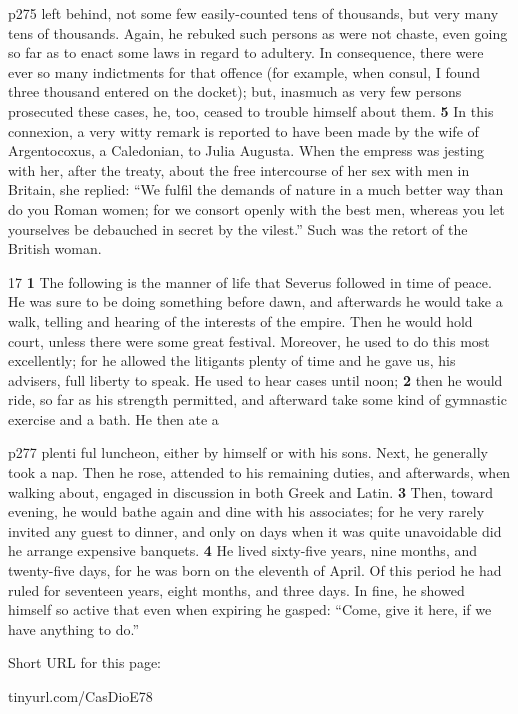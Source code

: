 p275 left behind, not some few easily-counted tens of thousands, but very many tens of thousands. Again, he rebuked such persons as were not chaste, even going so far as to enact some laws in regard to adultery. In consequence, there were ever so many indictments for that offence (for example, when consul, I found three thousand entered on the docket); but, inasmuch as very few persons prosecuted these cases, he, too, ceased to trouble himself about them. \textbf{5} In this connexion, a very witty remark is reported to have been made by the wife of Argentocoxus, a Caledonian, to Julia Augusta. When the empress was jesting with her, after the treaty, about the free intercourse of her sex with men in Britain, she replied: ``We fulfil the demands of nature in a much better way than do you Roman women; for we consort openly with the best men, whereas you let yourselves be debauched in secret by the vilest.'' Such was the retort of the British woman.

17
\textbf{1} The following is the manner of life that Severus followed in time of peace. He was sure to be doing something before dawn, and afterwards he would take a walk, telling and hearing of the interests of the empire. Then he would hold court, unless there were some great festival. Moreover, he used to do this most excellently; for he allowed the litigants plenty of time and he gave us, his advisers, full liberty to speak. He used to hear cases until noon; \textbf{2} then he would ride, so far as his strength permitted, and afterward take some kind of gymnastic exercise and a bath. He then ate a

p277 plenti ­ful luncheon, either by himself or with his sons. Next, he generally took a nap. Then he rose, attended to his remaining duties, and afterwards, when walking about, engaged in discussion in both Greek and Latin. \textbf{3} Then, toward evening, he would bathe again and dine with his associates; for he very rarely invited any guest to dinner, and only on days when it was quite unavoidable did he arrange expensive banquets. \textbf{4} He lived sixty-five years, nine months, and twenty-five days, for he was born on the eleventh of April. Of this period he had ruled for seventeen years, eight months, and three days. In fine, he showed himself so active that even when expiring he gasped: ``Come, give it here, if we have anything to do.''


Short URL for this page:

tinyurl.com/CasDioE78

